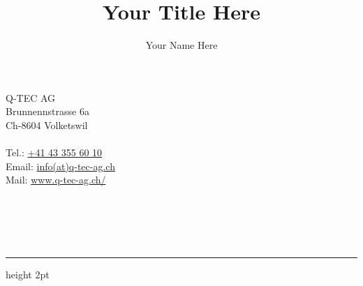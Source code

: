 \documentclass[oneside]{report}
\author{Your Name Here}
\title{Your Title Here}
\newcommand{\Hrule}[4][.]{%
	\par\addvspace{#2}%
	\begingroup\color{CorpColor}%
	\hrule height #4
	\endgroup
	\addvspace{#3}%
}
\begin{document}
	\section*{}\label{AlgemeinInfo}
	\begin{minipage}{.25\textwidth}
		\singlespacing
		\textcolor{CorpColor}{Q-TEC AG \\%
			Brunnennstrasse 6a\\
			Ch-8604 Volketswil\\}
		\phantom{This text will be invisible}\\
		Tel.:  \href{+41 (0)43 355 60 10}{+41 43 355 60 10} \\
		Email: \href{info(at)q-tec-ag.ch}{info(at)q-tec-ag.ch}\\
		Mail:  \href{http://www.q-tec-ag.ch/}{www.q-tec-ag.ch/}
	\end{minipage}%
\begin{minipage}{.4\textwidth}
	\singlespacing
	\\
\end{minipage}
\begin{minipage}{.35\textwidth}
	\singlespacing
	\flushright
	\\
	\\
	
\end{minipage}

\Hrule[red!40]{3pt}{1pt}{2pt}
\end{document}
